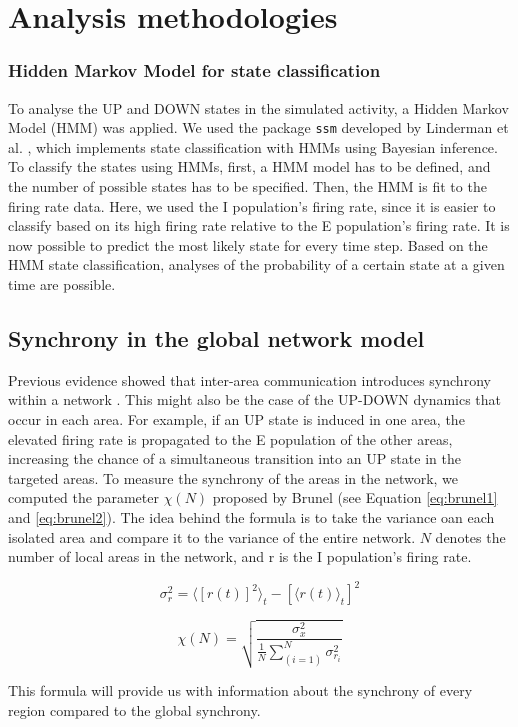 \section{Analysis methodologies}

\subsubsection{Hidden Markov Model for state classification\label{sec:hmm}}
\noindent
\indent To analyse the UP and DOWN states in the simulated activity, a Hidden Markov Model (HMM) was applied. We used the package \verb|ssm| developed by Linderman et al. \cite{Linderman_SSM_Bayesian_Learning_2020}, which implements state classification with HMMs using Bayesian inference. To classify the states using HMMs, first, a HMM model has to be defined, and the number of possible states has to be specified. Then, the HMM is fit to the firing rate data. Here, we used the I population's firing rate, since it is easier to classify based on its high firing rate relative to the E population's firing rate. It is now possible to predict the most likely state for every time step. Based on the HMM state classification, analyses of the probability of a certain state at a given time are possible.

\subsection{Synchrony in the global network model}\label{cha:brunel}
\noindent
\indent Previous evidence showed that inter-area communication introduces synchrony within a network \cite{varelaBrainwebPhaseSynchronization2001, holcmanEmergenceStatesCortical2006}. This might also be the case of the UP-DOWN dynamics that occur in each area. For example, if an UP state is induced in one area, the elevated firing rate is propagated to the E population of the other areas, increasing the chance of a simultaneous transition into an UP state in the targeted areas. To measure the synchrony of the areas in the network, we computed the parameter $\chi(N)$ proposed by Brunel \cite{brunelCommunicatedPaulTiesinga2006} (see Equation \ref{eq:brunel1} and \ref{eq:brunel2}). The idea behind the formula is to take the variance
oan each isolated area and compare it to the variance of the entire network. $N$ denotes the number of local areas in the network, and r is the I population's firing rate.  

\begin{equation}\label{eq:brunel1}
    \sigma^2_r = \langle [r(t)]^2  \rangle_t - [
 \langle r(t) \rangle_t]^2 
\end{equation}

\begin{equation}\label{eq:brunel2}
    \chi(N) = \sqrt{\frac{\sigma^2_x}{\frac{1}{N}\sum^N_(i=1)\sigma^2_{r_i}}}
\end{equation}

This formula will provide us with information about the synchrony of every region compared to the global synchrony.

